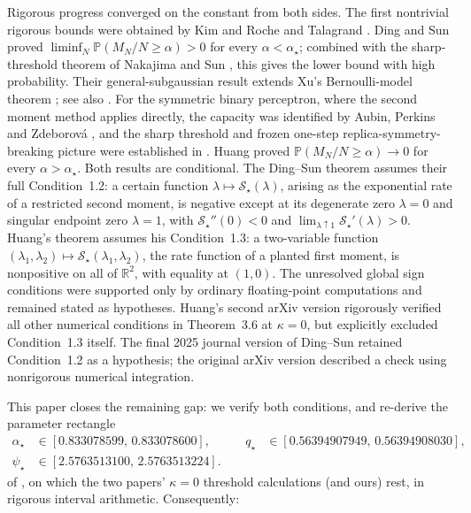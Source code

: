 \documentclass[11pt]{article}
\newcommand{\R}{\mathbb{R}}
\newcommand{\PP}{\mathbb{P}}
\begin{document}
Rigorous progress converged on the constant from both sides. The first
nontrivial rigorous bounds were obtained by Kim and Roche
\cite{kim1998covering} and Talagrand \cite{talagrand1999intersecting}. Ding and
Sun \cite{ding2018capacity} proved
$\liminf_N \PP(M_N/N \ge \alpha) > 0$ for every $\alpha < \alpha_\star$;
combined with the sharp-threshold theorem of Nakajima and Sun
\cite{nakajima2023sharp}, this gives the lower bound with high probability.
Their general-subgaussian result extends Xu's Bernoulli-model theorem
\cite{xu2021sharp}; see also \cite{altschuler2024capacity}. For the
symmetric binary perceptron, where the second moment method applies directly,
the capacity was identified by Aubin, Perkins and Zdeborov\'a
\cite{aubin2019storage}, and the sharp threshold and frozen one-step
replica-symmetry-breaking picture were established in
\cite{perkins2021frozen,abbe2021contiguity}. Huang
\cite{huang2024capacity} proved
$\PP(M_N/N \ge \alpha) \to 0$ for every $\alpha > \alpha_\star$. Both
results are conditional. The Ding--Sun theorem assumes their full
Condition~1.2: a certain function
$\lambda \mapsto \mathscr{S}_\star(\lambda)$, arising as the exponential rate
of a restricted second moment, is negative except at its degenerate zero
$\lambda=0$ and singular endpoint zero $\lambda=1$, with
$\mathscr S_\star''(0)<0$ and
$\lim_{\lambda\uparrow1}\mathscr S_\star'(\lambda)>0$. Huang's theorem assumes his
Condition~1.3: a two-variable function
$(\lambda_1,\lambda_2) \mapsto \mathcal{S}_\star(\lambda_1,\lambda_2)$,
the rate function of a planted first moment, is nonpositive on all of
$\R^2$, with equality at $(1,0)$. The unresolved global sign conditions were
supported only by ordinary floating-point computations and remained stated
as hypotheses. Huang's second arXiv version rigorously verified all other
numerical conditions in Theorem~3.6 at $\kappa=0$, but explicitly excluded
Condition~1.3 itself. The final 2025 journal version of Ding--Sun retained
Condition~1.2 as a hypothesis; the original arXiv version described a check using nonrigorous
numerical integration.

This paper closes the remaining gap: we verify both conditions, and
re-derive the parameter rectangle
\[
\begin{aligned}
  \alpha_\star &\in [0.833078599,\, 0.833078600], \qquad&
  q_\star &\in [0.56394907949,\, 0.56394908030],\\
  \psi_\star &\in [2.5763513100,\, 2.5763513224]. &&
\end{aligned}
\]
of \cite[Proposition~1.3]{ding2018capacity}, on which the two papers'
$\kappa=0$ threshold calculations (and ours) rest, in rigorous interval
arithmetic. Consequently:
\end{document}
